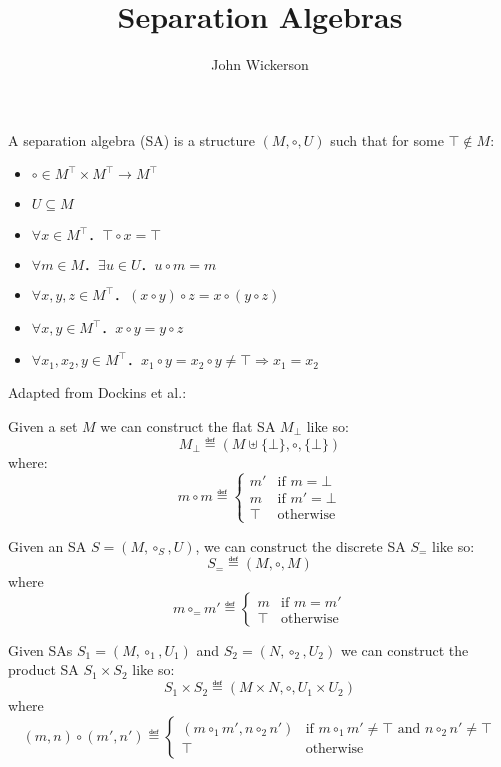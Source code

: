 \documentclass[12pt,a4paper]{article}
\title{Separation Algebras}
\author{John Wickerson}
\date{}
\begin{document}
\maketitle

A separation algebra (SA) is a structure $(M, ∘, U)$ such that for some $\top ∉ M$:
\begin{itemize}
\item $∘ ∈ M^\top × M^\top → M^\top$
\item $U⊆M$
\item $∀x∈M^\top．\top ∘ x = \top$ 
\item $∀m∈M．∃u∈U．u ∘ m = m$
\item $∀x,y,z∈M^\top．(x ∘ y) ∘ z = x ∘ (y ∘ z)$
\item $∀x,y∈M^\top．x ∘ y = y ∘ z$
\item $∀x_1,x_2,y∈M^\top．x_1 ∘ y = x_2 ∘ y ≠ \top ⇒ x_1 = x_2$
\end{itemize}
Adapted from Dockins et al.:

\begin{defn}
Given a set $M$ we can construct the flat SA $M_\bot$ like so:
\[
M_\bot \eqdef (M\uplus\{\bot\}, ∘, \{\bot\})
\]
where:
\[
m ∘ m \eqdef \begin{cases} m'  & \text{if $m = \bot$} \\ m  & \text{if $m' = \bot$} \\ \top & \text{otherwise} \end{cases}
\] 
\end{defn}

\begin{defn}
Given an SA $S = (M, ∘_S, U)$, we can construct the discrete SA $S_=$ like so:
\[
S_= \eqdef (M, ∘, M)
\]
where
\[
m ∘_= m' \eqdef \begin{cases} m  & \text{if $m = m'$} \\ \top & \text{otherwise} \end{cases}
\] 
\end{defn}

\begin{defn}
Given SAs $S_1 = (M, ∘_1, U_1)$ and $S_2 = (N, ∘_2, U_2)$ we can construct the product SA $S_1 × S_2$ like so:
\[
S_1 × S_2 \eqdef (M×N, ∘, U_1 × U_2)
\]
where
\[
(m,n) ∘ (m',n') \eqdef \begin{cases} (m ∘_1 m', n ∘_2 n') & \text{if $m ∘_1 m' ≠ \top$ and $n ∘_2 n' ≠ \top$} \\ \top & \text{otherwise} \end{cases}
\]
\end{defn}
\end{document}
